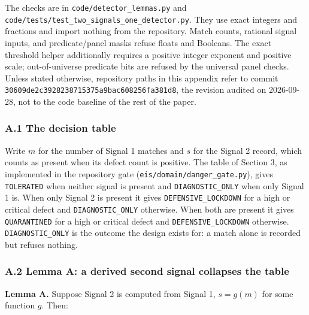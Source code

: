 \documentclass[
  11pt,
]{article}
\newcommand{\passthrough}[1]{#1}
\begin{document}
The checks are in \texttt{\nolinkurl{code/detector_lemmas.py}} and
\texttt{\nolinkurl{code/tests/test_two_signals_one_detector.py}}.
They use exact integers and fractions and import nothing from the
repository. Match counts, rational signal inputs, and predicate/panel
masks refuse floats and Booleans. The exact threshold helper
additionally requires a positive integer exponent and positive scale;
out-of-universe predicate bits are refused by the universal panel
checks. Unless stated otherwise, repository paths in this appendix refer
to commit
\texttt{\nolinkurl{30609de2c3928238715375a9bac608256fa381d8}}, the
revision audited on 2026-09-28, not to the code baseline of the rest of
the paper.

\hypertarget{a.1-the-decision-table}{%
\subsubsection{A.1 The decision table}\label{a.1-the-decision-table}}

Write \(m\) for the number of Signal 1 matches and \(s\) for the Signal
2 record, which counts as present when its defect count is positive. The
table of Section 3, as implemented in the repository gate
(\texttt{\nolinkurl{eis/domain/danger_gate.py}}),
gives \passthrough{\lstinline!TOLERATED!} when neither signal is present
and \texttt{\nolinkurl{DIAGNOSTIC_ONLY}} when only Signal 1 is.
When only Signal 2 is present it gives
\texttt{\nolinkurl{DEFENSIVE_LOCKDOWN}} for a high or critical
defect and \texttt{\nolinkurl{DIAGNOSTIC_ONLY}} otherwise. When
both are present it gives \passthrough{\lstinline!QUARANTINED!} for a
high or critical defect and
\texttt{\nolinkurl{DEFENSIVE_LOCKDOWN}} otherwise.
\texttt{\nolinkurl{DIAGNOSTIC_ONLY}} is the outcome the design
exists for: a match alone is recorded but refuses nothing.

\hypertarget{a.2-lemma-a-a-derived-second-signal-collapses-the-table}{%
\subsubsection{A.2 Lemma A: a derived second signal collapses the
table}\label{a.2-lemma-a-a-derived-second-signal-collapses-the-table}}

\textbf{Lemma A.} Suppose Signal 2 is computed from Signal 1,
\(s = g(m)\) for some function \(g\). Then:
\end{document}
